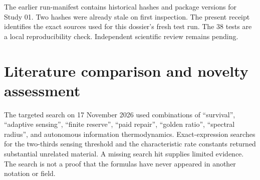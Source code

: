 \documentclass[
  11pt,
]{article}
\begin{document}
The earlier run-manifest contains historical hashes and package versions
for Study 01. Two hashes were already stale on first inspection. The
present receipt identifies the exact sources used for this dossier's
fresh test run. The 38 tests are a local reproducibility check.
Independent scientific review remains pending.

\section{Literature comparison and novelty
assessment}\label{literature-comparison-and-novelty-assessment}

The targeted search on 17 November 2026 used combinations of
``survival'', ``adaptive sensing'', ``finite reserve'', ``paid repair'',
``golden ratio'', ``spectral radius'', and autonomous information
thermodynamics. Exact-expression searches for the two-thirds sensing
threshold and the characteristic rate constants returned substantial
unrelated material. A missing search hit supplies limited evidence. The
search is not a proof that the formulas have never appeared in another
notation or field.
\end{document}
